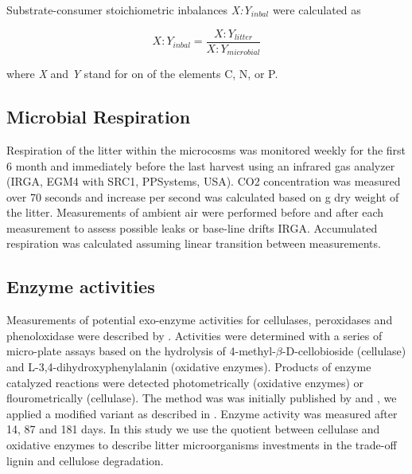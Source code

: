 Substrate-consumer stoichiometric inbalances \emph{X:Y$_{inbal}$} were calculated as

 \begin{equation}
X:Y_{inbal}=\frac{X:Y_{litter}}{X:Y_{microbial}} \label{eq:resp.acc}
 \end{equation}

where \emph{X} and \emph{Y} stand for on of the elements C, N, or P.

\subsection{Microbial Respiration}
Respiration of the litter within the microcosms was monitored weekly for the first 6 month and immediately before the last harvest using an infrared gas analyzer (IRGA, EGM4 with SRC1, PPSystems, USA). CO2 concentration was measured over 70 seconds and increase per second was calculated based on g dry weight of the litter. Measurements of ambient air were performed before and after each measurement to assess possible leaks or base-line drifts IRGA. %
Accumulated respiration was calculated assuming linear transition between measurements.


\subsection{Enzyme activities}

Measurements of potential exo-enzyme activities for cellulases, peroxidases and phenoloxidase were described by \cite{Leitner2011}. Activities were determined with a series of micro-plate assays based on the hydrolysis of 4-methyl-$\beta$-D-cellobioside (cellulase) and L-3,4-di\-hydroxy\-phenyl\-alanin (oxidative enzymes). Products of enzyme catalyzed reactions were detected photometrically (oxidative enzymes) or flourometrically (cellulase). The method was was initially published by \cite{Marx2001} and \cite{Sinsabaugh1999}, we applied a modified variant as described in \cite{Kaiser2010b}. Enzyme activity was measured after 14, 87 and 181 days. In this study we use the quotient between cellulase and oxidative enzymes to describe litter microorganisms investments in the trade-off lignin and cellulose degradation. 

